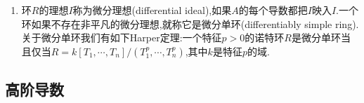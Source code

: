 \begin{enumerate}
\begin{proof}
    	首先如果$\Omega_{L/K}=0$,那么$L/K$不能有超越元也不能有纯不可分元(不能有超越元因为命题里的不等式,不能有纯不可分元因为上一条证明中得到了此时$\Omega_{L/K}$是非平凡的).如果$L/K$是可分扩张,那么$L/K$是0-光滑的,按照第一基本正合列得到$\Gamma_{L/K/k}=0$,于是此时有$\dim_L\Omega_{L/K}=\mathrm{tr.deg}_KL$.反过来如果这个等式取等,取$L/K$的微分基是$\{x_1,\cdots,x_n\}$,也即$\mathrm{d}x_1,\cdots,\mathrm{d}x_n$是$\Omega_{L/K}$的$L$-基.那么按照第一基本正合列得到:
    	$$\xymatrix{\Omega_{K(x_1,\cdots,x_n)/K}\otimes_{K(x_1,\cdots,x_n)}L\ar[r]&\Omega_{L/K}\ar[r]&\Omega_{L/K(x_1,\cdots,x_n)}\ar[r]&0}$$
    	
    	但是这里第一个同态是满的,说明$\Omega_{L/K(x_1,\cdots,x_n)}=0$,按照之前的解释就有$L/K(x_1,\cdots,x_n)$是可分代数扩张.但是$L/K$是超越维数$n$的扩张,这迫使$\{x_1,\cdots,x_n\}$本身是一组超越基.
    \end{proof}
    \item 环$R$的理想$I$称为微分理想(differential ideal),如果$A$的每个导数都把$I$映入$I$.一个环如果不存在非平凡的微分理想,就称它是微分单环(differentiably simple ring).关于微分单环我们有如下Harper定理:一个特征$p>0$的诺特环$R$是微分单环当且仅当$R=k[T_1,\cdots,T_n]/(T_1^p,\cdots,T_n^p)$,其中$k$是特征$p$的域.
\end{enumerate}
\newpage
\subsection{高阶导数}

